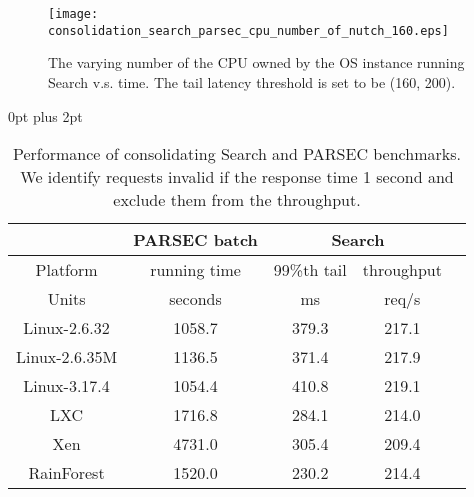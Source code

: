 \documentclass[pageno]{jpaper}
\begin{document}
\begin{figure}[t]
\setlength{\abovecaptionskip}{3pt}
\setlength{\belowcaptionskip}{0pt}
  \centering
\texttt{[image: consolidation\_search\_parsec\_cpu\_number\_of\_nutch\_160.eps]}
  \caption{The varying number of the CPU owned by the OS instance running Search v.s. time. The tail latency threshold   is set to be (160, 200).
}
  \label{fig_cpu_number_of_nutch_consolidation_parsec}
\end{figure}







\begin{table}[t]
\renewcommand{\arraystretch}{1.1}
\setlength{\abovecaptionskip}{3pt}
\setlength{\belowcaptionskip}{0pt}
\setlength{\textfloatsep} {0pt plus 2pt}
\setlength{\tabcolsep}{5pt}
\centering
\caption{Performance of consolidating Search and PARSEC benchmarks. We identify requests invalid if the response time  1 second and exclude them from the throughput.}
\label{table_consolidation_results}
\begin{lrbox}{\tablebox}
\begin{tabular}{|c|c|c|c|c|}
\hline
& PARSEC batch & \multicolumn{2}{c|}{Search} \\ \hline
Platform &  running time & 99\%th tail & throughput \\ \hline
Units & seconds & ms & req/s \\ \hline
Linux-2.6.32 & 1058.7 & 379.3 & 217.1\\ \hline
Linux-2.6.35M & 1136.5 & 371.4 & 217.9  \\ \hline
Linux-3.17.4 & 1054.4 & 410.8  & 219.1 \\ \hline
LXC & 1716.8 & 284.1 & 214.0 \\ \hline
Xen & 4731.0 & 305.4 & 209.4\\ \hline
RainForest& 1520.0 & 230.2 & 214.4\\ \hline
\end{tabular}
\end{lrbox}
\scalebox{0.8}{\usebox{\tablebox}}
\end{table}
\end{document}
